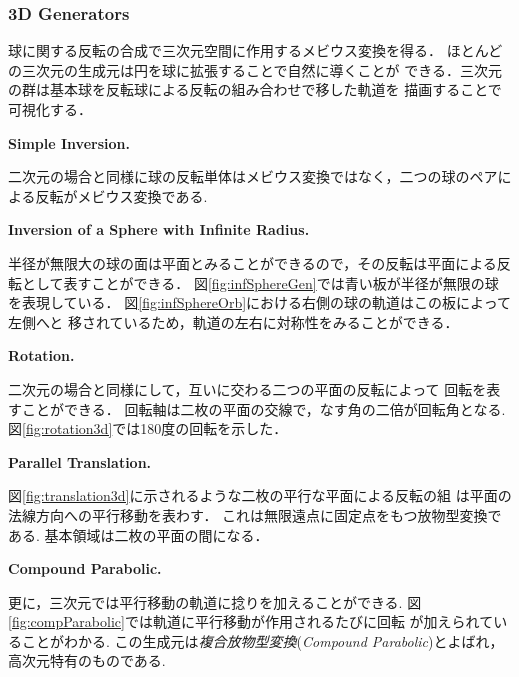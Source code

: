 \subsubsection{3D Generators}

球に関する反転の合成で三次元空間に作用するメビウス変換を得る．
ほとんどの三次元の生成元は円を球に拡張することで自然に導くことが
できる．三次元の群は基本球を反転球による反転の組み合わせで移した軌道を
描画することで可視化する．

\noindent\textbf{Simple Inversion.}

二次元の場合と同様に球の反転単体はメビウス変換ではなく，二つの球のペアに
よる反転がメビウス変換である.

\noindent\textbf{Inversion of a Sphere with Infinite Radius.}

半径が無限大の球の面は平面とみることができるので，その反転は平面による反
転として表すことができる．
図\ref{fig:infSphereGen}では青い板が半径が無限の球を表現している．
図\ref{fig:infSphereOrb}における右側の球の軌道はこの板によって左側へと
移されているため，軌道の左右に対称性をみることができる．

\noindent\textbf{Rotation.}

二次元の場合と同様にして，互いに交わる二つの平面の反転によって
回転を表すことができる．
回転軸は二枚の平面の交線で，なす角の二倍が回転角となる.
図\ref{fig:rotation3d}では180度の回転を示した．

\noindent\textbf{Parallel Translation.}

図\ref{fig:translation3d}に示されるような二枚の平行な平面による反転の組
は平面の法線方向への平行移動を表わす．
これは無限遠点に固定点をもつ放物型変換である.
基本領域は二枚の平面の間になる．

\noindent\textbf{Compound Parabolic.}

更に，三次元では平行移動の軌道に捻りを加えることができる.
図\ref{fig:compParabolic}では軌道に平行移動が作用されるたびに回転
が加えられていることがわかる.
この生成元は\emph{複合放物型変換}(\textit{Compound Parabolic})とよばれ，
高次元特有のものである.

